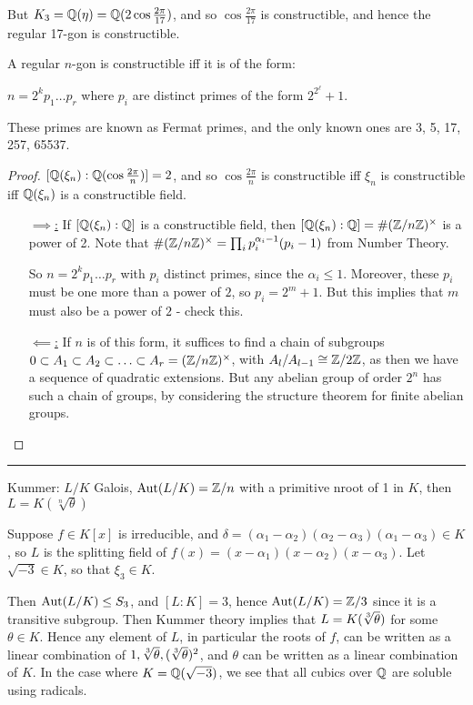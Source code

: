 \documentclass[10pt,a4paper]{article}
\begin{document}
\begin{enumerate}
\begin{enumerate}
But $K_3 = \mathbb{Q}(\eta) = \mathbb{Q}(2\cos \frac{2\pi}{17})$, and so $\cos \frac{2\pi}{17}$ is constructible, and hence the regular 17-gon is constructible.
\begin{theorem}[Gauss]
A regular $n$-gon is constructible iff it is of the form:
\begin{center}
$n = 2^k p_1\ldots p_r$ where $p_i$ are distinct primes of the form $2^{2^\ell} + 1$.
\end{center}
These primes are known as Fermat primes, and the only known ones are 3, 5, 17, 257, 65537.
\end{theorem}
\begin{proof}
$[\mathbb{Q}(\xi_n):\mathbb{Q}(\cos\frac{2\pi}{n})] = 2$, and so $\cos \frac{2\pi}{n}$ is constructible iff $\xi_n$ is constructible iff $\mathbb{Q}(\xi_n)$ is a constructible field.
\begin{itemize}
\item[\underline{$\implies$:}] If $[\mathbb{Q}(\xi_n):\mathbb{Q}]$ is a constructible field, then $[\mathbb{Q}(\xi_n):\mathbb{Q}] = \#(\mathbb{Z}/n\mathbb{Z})^{\times}$ is a power of 2. Note that $\#(\mathbb{Z}/n\mathbb{Z})^{\times} = \prod_i p_i^{\alpha_i-1}(p_i-1)$ from Number Theory.

So $n = 2^k p_1\ldots p_r$ with $p_i$ distinct primes, since the $\alpha_i \leq 1$. Moreover, these $p_i$ must be one more than a power of $2$, so $p_i = 2^m + 1$. But this implies that $m$ must also be a power of $2$ - check this.

\item[\underline{$\impliedby$:}] If $n$ is of this form, it suffices to find a chain of subgroups $0 \subset A_1 \subset A_2 \subset \ldots \subset A_r = (\mathbb{Z}/n\mathbb{Z})^{\times}$, with $A_l/A_{l-1} \cong \mathbb{Z}/2\mathbb{Z}$, as then we have a sequence of quadratic extensions. But any abelian group of order $2^n$ has such a chain of groups, by considering the structure theorem for finite abelian groups.
\end{itemize}
\end{proof}
\end{enumerate}
\end{enumerate}
\hrule
Kummer: $L/K$ Galois, $\operatorname{Aut}(L/K) = \mathbb{Z}/n$ with a primitive n\th root of 1 in $K$, then $L = K(\sqrt[n]{\theta})$

Suppose $f \in K[x]$ is irreducible, and $\delta = (\alpha_1-\alpha_2)(\alpha_2-\alpha_3)(\alpha_1-\alpha_3) \in K$, so $L$ is the splitting field of $f(x) = (x-\alpha_1)(x-\alpha_2)(x-\alpha_3)$. Let $\sqrt{-3} \in K$, so that $\xi_3 \in K$.

Then $\operatorname{Aut}(L/K) \leq S_3$, and $[L:K] = 3$, hence $\operatorname{Aut}(L/K) = \mathbb{Z}/3$ since it is a transitive subgroup. Then Kummer theory implies that $L = K(\sqrt[3]{\theta})$ for some $\theta \in K$. Hence any element of $L$, in particular the roots of $f$, can be written as a linear combination of $1, \sqrt[3]{\theta}, (\sqrt[3]{\theta})^2$, and $\theta$ can be written as a linear combination of $K$. In the case where $K = \mathbb{Q}(\sqrt{-3})$, we see that all cubics over $\mathbb{Q}$ are soluble using radicals.
\end{document}
